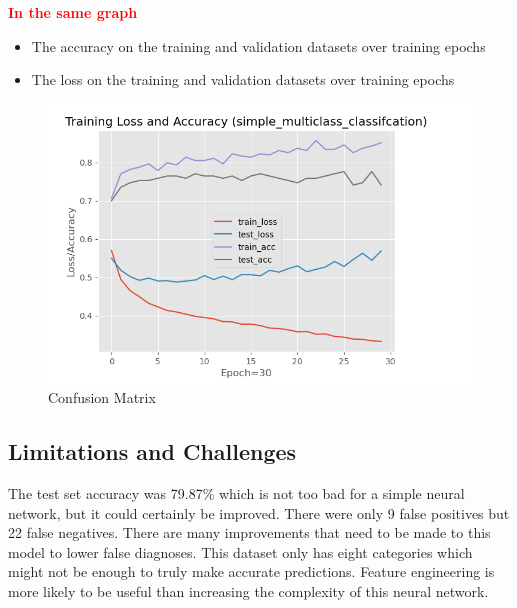 \hspace{1cm} \textbf{\textcolor{red}{ In the same graph}}
\begin{itemize}
    \item The accuracy on the training and validation datasets over training epochs
    \item  The loss on the training and validation datasets over training epochs 
\end{itemize}
\newpage
\begin{figure}[htp]
    \centering
    \includegraphics[width=1.2\textwidth]{images/graph.png}
    \caption{Confusion Matrix }
    \label{fig:example}
\end{figure}



\subsection{Limitations and Challenges}
\label{sec:limitation}
The test set accuracy was 79.87\% which is not too bad for
 a simple neural network, but it could certainly be improved.
  There were only 9 false positives but 22 false negatives.
   There are many improvements that need to be made to this model to 
   lower false diagnoses. This dataset only has eight categories
    which might not be enough to truly make accurate predictions.
     Feature engineering is more likely to be useful than increasing
      the complexity of this neural network.

